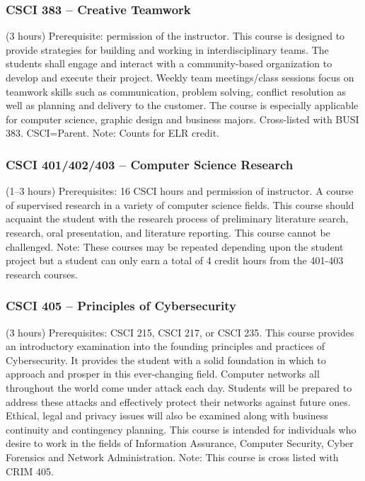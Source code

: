 \subsubsection{CSCI 383 -- Creative Teamwork}
(3 hours) Prerequisite: permission of the instructor. This course is designed to provide strategies for building and working in interdisciplinary teams. The students shall engage and interact with a community-based organization to develop and execute their project. Weekly team meetings/class sessions focus on teamwork skills such as communication, problem solving, conflict resolution as well as planning and delivery to the customer. The course is especially applicable for computer science, graphic design and business majors. Cross-listed with BUSI 383. CSCI=Parent. Note: Counts for ELR credit.

\subsubsection{CSCI 401/402/403 -- Computer Science Research}
(1--3 hours) Prerequisites: 16 CSCI hours and permission of instructor. A course of supervised research in a variety of computer science fields. This course should acquaint the student with the research process of preliminary literature search, research, oral presentation, and literature reporting. This course cannot be challenged. Note: These courses may be repeated depending upon the student project but a student can only earn a total of 4 credit hours from the 401-403 research courses.

\subsubsection{CSCI 405 -- Principles of Cybersecurity}
(3 hours) Prerequisites: CSCI 215, CSCI 217, or CSCI 235. This course provides an introductory examination into the founding principles and practices of Cybersecurity.  It provides the student with a solid foundation in which to approach and prosper in this ever-changing field.  Computer networks all throughout the world come under attack each day.  Students will be prepared to address these attacks and effectively protect their networks against future ones.  Ethical, legal and privacy issues will also be examined along with business continuity and contingency planning.  This course is intended for individuals who desire to work in the fields of Information Assurance, Computer Security, Cyber Forensics and Network Administration. Note: This course is cross listed with CRIM 405.

